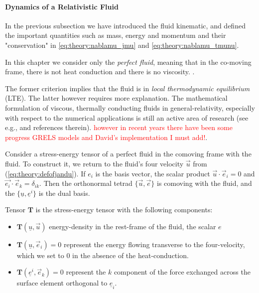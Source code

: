 \paragraph{Dynamics of a Relativistic Fluid}


In the previous subsection we have introduced the fluid kinematic, and defined the important quantities such as mass, energy and momentum and their "conservation" in \ref{eq:theory:nablamu_jmu} and \ref{eq:theory:nablamu_tmunu}.

In this  chapter we consider only the \textit{perfect fluid}, meaning that in the co-moving frame, there is not heat conduction and there is no viscosity. 
. 

The former criterion implies that the fluid is in \textit{local thermodynamic equilibrium} (LTE). 
The latter however requires more explanation. 
The mathematical formulation of viscous, thermally conducting fluids in general-relativity, especially with respect to the numerical applications is still an active area of research  (see e.g., \cite{Andersson:2006nr} and references therein). 
\textcolor{red}{however in recent years there have been some progress GRELS models and David's implementation I must add!}.

Consider a stress-energy tensor of a perfect fluid in the comoving frame with the fluid. 
To construct it, we return to the fluid's four velocity $\vec{u}$ from (\ref{eq:theory:defofjandu}). 
If $e_{i}$ is the basis vector, the scalar product $\vec{u}\cdot\vec{e}_i=0$ and $\vec{e_i}\cdot\vec{e}_k = \delta_{ik}$. 
Then the orthonormal tetrad $\{\vec{u},\vec{e}\}$ is comoving with the fluid, and the $\{\underline{u},\underline{e}^i\}$ is the dual basis. 

Tensor $\boldsymbol{T}$ is the stress-energy tensor with the following components: 

\begin{itemize}
    \item $\boldsymbol{T}(\underline{u}, \vec{u})$ energy-density in the rest-frame of the fluid, the scalar $e$
    \item $\boldsymbol{T}(\underline{u}, \vec{e}_i) = 0$ represent the energy flowing transverse to the four-velocity, which we set to $0$ in the absence of the heat-conduction.
    \item $\boldsymbol{T}(\underline{e}^i, \vec{e}_k) = 0$ represent the $k$ component of the force exchanged across the surface element orthogonal to $\underline{e}_i$.
\end{itemize}

